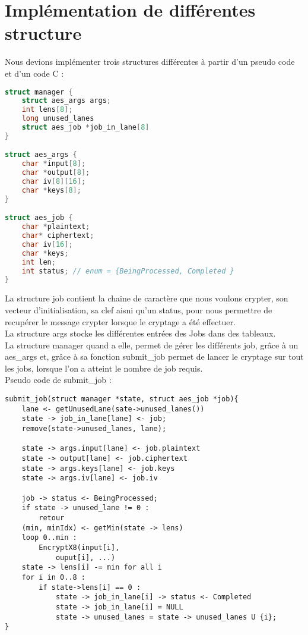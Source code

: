 \documentclass{article}
\begin{document}
\section{Implémentation de différentes structure}
    Nous devions implémenter trois structures différentes à partir d'un pseudo code et d'un code C :
\begin{lstlisting}[language = C]
struct manager {
	struct aes_args args;
	int lens[8];
	long unused_lanes
	struct aes_job *job_in_lane[8]
}

struct aes_args {
	char *input[8];
	char *output[8];
	char iv[8][16];
	char *keys[8];
}

struct aes_job {
	char *plaintext;
	char* ciphertext;
	char iv[16];
	char *keys;
	int len;
	int status; // enum = {BeingProcessed, Completed }
}
\end{lstlisting}

La structure job contient la chaine de caractère que nous voulons crypter, son vecteur d'initialisation, sa clef aisni qu'un status, pour nous permettre de recupérer le message crypter lorsque le cryptage a été effectuer.
\\
La structure args stocke les différentes entrées des Jobs dans des tableaux.
\\
La structure manager quand a elle, permet de gérer les différents job, grâce à un aes\_args et, grâce à sa fonction submit\_job permet de lancer le cryptage sur tout les jobs, lorsque l'on a atteint le nombre de job requis.
\\
Pseudo code de submit\_job :
\begin{lstlisting}
submit_job(struct manager *state, struct aes_job *job){
	lane <- getUnusedLane(sate->unused_lanes())
	state -> job_in_lane[lane] <- job;
	remove(state->unused_lanes, lane);

	state -> args.input[lane] <- job.plaintext
	state -> output[lane] <- job.ciphertext
	state -> args.keys[lane] <- job.keys
	state -> args.iv[lane] <- job.iv

	job -> status <- BeingProcessed;
	if state -> unused_lane != 0 :
		retour
	(min, minIdx) <- getMin(state -> lens) 
	loop 0..min :
		EncryptX8(input[i],
			ouput[i], ...)
	state -> lens[i] -= min for all i
	for i in 0..8 :
		if state->lens[i] == 0 :
			state -> job_in_lane[i] -> status <- Completed
			state -> job_in_lane[i] = NULL
			state -> unused_lanes = state -> unused_lanes U {i};
}
\end{lstlisting}
\end{document}
